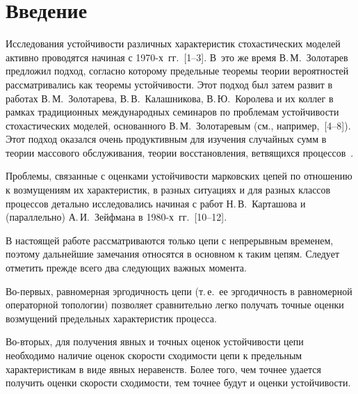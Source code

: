 


      \thispagestyle{headings}

      \begin{multicols}{2}

            \label{st\stat}

\section{Введение}

Исследования устойчивости различных характеристик стохастических
моделей активно проводятся начиная с 1970-х~гг.~[1--3]. В~это же
время В.\,М.~Золотарев предложил подход, согласно которому предельные
теоремы теории вероятностей рассматривались как теоремы
устойчивости. Этот подход был затем развит в работах  В.\,М.~Золотарева,
В.\,В.~Калашникова, В.\,Ю.~Королева и их коллег в рамках
традиционных международных семинаров по проблемам устойчивости
стохастических моделей, основанного В.\,М.~Золотаревым (см.,
например,~[4--8]). Этот подход оказался очень продуктивным для
изучения случайных сумм в теории массового обслуживания, теории
восстановления, ветвящихся процессов~\cite{gk}.

Проблемы, связанные с оценками устойчивости марковских цепей по
отношению к возмущениям их характеристик, в разных ситуациях и для
разных классов процессов детально исследовались начиная с работ
Н.\,В.~Карташова и (параллельно) А.\,И.~Зейф\-ма\-на в 1980-х~гг.~[10--12].

В настоящей работе рассматриваются только цепи с непрерывным временем, поэтому дальнейшие
замечания относятся в основном к таким цепям. Следует отметить
прежде всего два следующих важных момента.

Во-первых, равномерная эргодичность цепи (т.\,е.\ ее эргодичность в равномерной операторной топологии)
позволяет сравнительно легко получать точные оценки возмущений предельных характеристик процесса.

Во-вторых, для получения явных и точных оценок устойчивости цепи
необходимо наличие оценок скорости сходимости цепи к предельным характеристикам
в виде явных неравенств. Более того, чем точнее удается получить оценки скорости сходимости, тем точнее
будут и оценки устой\-чи\-вости.


\end{multicols}
